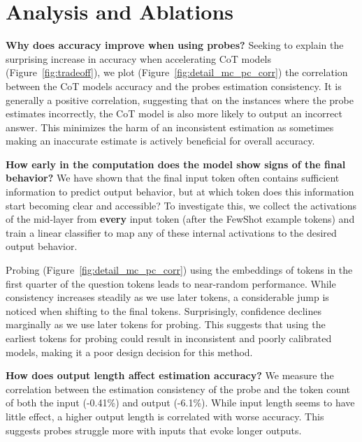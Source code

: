 \section{Analysis and Ablations}
\label{sec:analysis}


\noindent\textbf{Why does accuracy improve when using probes?} Seeking to explain the surprising increase in accuracy when accelerating CoT models (Figure~\ref{fig:tradeoff}), we plot (Figure~\ref{fig:detail_mc_pc_corr}) the correlation between the CoT models accuracy and the probes estimation consistency. It is generally a positive correlation, suggesting that on the instances where the probe estimates incorrectly, the CoT model is also more likely to output an incorrect answer. This minimizes the harm of an inconsistent estimation as sometimes making an inaccurate estimate is actively beneficial for overall accuracy.
 



\noindent\textbf{How early in the computation does the model show signs of the final behavior?} We have shown that the final input token often contains sufficient information to predict output behavior, but at which token does this information start becoming clear and accessible? To investigate this, we collect the activations of the mid-layer from \textbf{every} input token (after the FewShot example tokens) and train a linear classifier to map any of these internal activations to the desired output behavior. 

Probing (Figure~\ref{fig:detail_mc_pc_corr}) using the embeddings of tokens in the first quarter of the question tokens leads to near-random performance. While consistency increases steadily as we use later tokens, a considerable jump is noticed when shifting to the final tokens. Surprisingly, confidence declines marginally as we use later tokens for probing. This suggests that using the earliest tokens for probing could result in inconsistent and poorly calibrated models, making it a poor design decision for this method. 

\noindent\textbf{How does output length affect estimation accuracy?} We measure the correlation between the estimation consistency of the probe and the token count of both the input (-0.41\%) and output (-6.1\%). While input length seems to have little effect, a higher output length is correlated with worse accuracy. This suggests probes struggle more with inputs that evoke longer outputs. 


